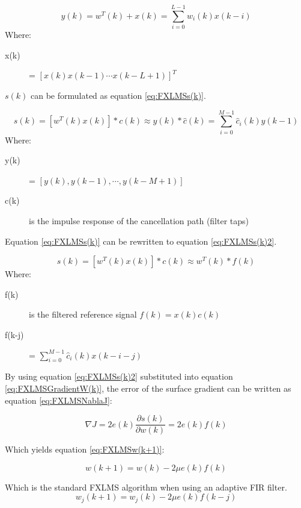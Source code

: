 \begin{equation}\label{eq:FXLMSOutput}
y(k) = w^T(k) + x(k) = \sum_{i=0}^{L-1} w_i(k)x(k-i)
\end{equation}
Where:
\begin{description}
	\item[x(k)] = $[x(k) x(k-1) \cdots x(k-L+1)]^T $
\end{description}
$s(k)$ can be formulated as equation \ref{eq:FXLMSs(k)}.

\begin{equation}\label{eq:FXLMSs(k)}
s(k) = [w^T(k)x(k)]*c(k)\approx y(k)*\hat{c}(k) = \sum_{i=0}^{M-1}\hat{c}_i(k)y(k-1)
\end{equation}
Where:
\begin{description}
	\item[y(k)] = $[ y(k), y(k-1), \cdots, y(k-M+1)]$
	\item[c(k)] is the impulse response of the cancellation path (filter taps)
\end{description}

Equation \ref{eq:FXLMSs(k)} can be rewritten to equation \ref{eq:FXLMSs(k)2}.

\begin{equation}\label{eq:FXLMSs(k)2}
s(k) = [w^T(k)x(k)]*c(k)\approx w^T(k)*f(k)
\end{equation}
Where:
\begin{description}
	\item[f(k)] is the filtered reference signal $f(k)=x(k)c(k)$
	\item[f(k-j)] = $\sum_{i=0}^{M-1}\hat{c}_i(k)x(k-i-j)$
\end{description}

By using equation \ref{eq:FXLMSs(k)2} substituted into equation \ref{eq:FXLMSGradientW(k)}, the error of the surface gradient can be written as equation \ref{eq:FXLMSNablaJ}:

\begin{equation}\label{eq:FXLMSNablaJ}
\nabla J = 2e(k)\frac{\partial s(k)}{\partial w(k)} = 2e(k)f(k)
\end{equation}

Which yields equation \ref{eq:FXLMSw(k+1)}:

\begin{equation}\label{eq:FXLMSw(k+1)}
w(k+1) = w(k) - 2\mu e(k)f(k)
\end{equation}

Which is the standard FXLMS algorithm when using an adaptive FIR filter.
\begin{equation}\label{eq:FXLMSw_j(k+1)}
w_j(k+1) = w_j(k) - 2\mu e(k)f(k-j)
\end{equation}

